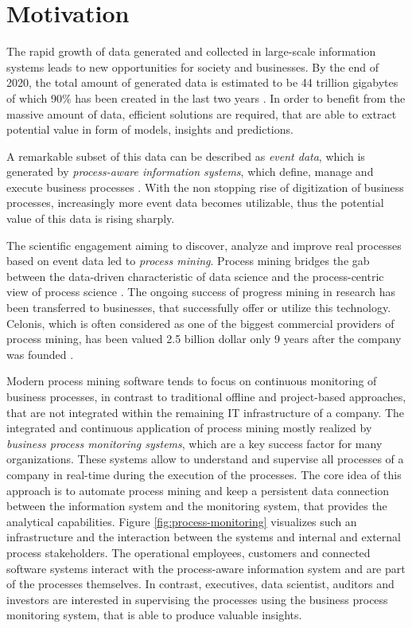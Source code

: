 
\section{Motivation}

The rapid growth of data generated and collected in large-scale information systems leads to new opportunities for  society and businesses. 
By the end of 2020, the total amount of generated data is estimated to be 44 trillion gigabytes of which 90\% has been created in the last two years \cite{datagrowth}.
In order to benefit from the massive amount of data, efficient solutions are required, that are able to extract potential value in form of models, insights and predictions.

A remarkable subset of this data can be described as \textit{event data}, which is generated by \textit{process-aware information systems}, which define, manage and execute business processes \cite{DBLP:journals/topnoc/Aalst09}.
With the non stopping rise of digitization of business processes, increasingly more event data becomes utilizable, thus the potential value of this data is rising sharply.

The scientific engagement aiming to discover, analyze and improve real processes based on event data led to \textit{process mining}. Process mining bridges the gab between the data-driven characteristic of data science and the process-centric view of process science  \cite{DBLP:books/sp/Aalst16}.
The ongoing success of progress mining in research has been transferred to businesses, that successfully offer or utilize this technology.
Celonis, which is often considered as one of the biggest commercial providers of process mining, has been valued 2.5 billion dollar only 9 years after the company was founded \cite{celonis}.

Modern process mining software tends to focus on continuous monitoring of business processes, in contrast to traditional offline and project-based approaches, that are not integrated within the remaining IT infrastructure of a company.
The integrated and continuous application of process mining mostly realized by \textit{business process monitoring systems}, which are a key success factor for many organizations.
These systems allow to understand and supervise all processes of a company in real-time during the execution of the processes.
The core idea of this approach is to automate process mining and keep a persistent data connection between the information system and the monitoring system, that provides the analytical capabilities.
Figure \ref{fig:process-monitoring} visualizes such an infrastructure and the interaction between the systems and internal and external process stakeholders.
The operational employees, customers and connected software systems interact with the process-aware information system and are part of the processes themselves.
In contrast, executives, data scientist, auditors and investors are interested in supervising the processes using the business process monitoring system, that is able to produce valuable insights.

